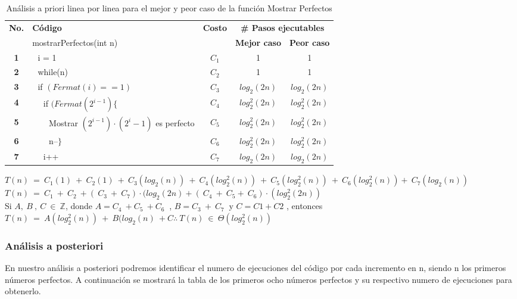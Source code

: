 \documentclass[12pt,twoside]{article}
\begin{document}
\begin{longtable}{||c|l|c|c|c||}
    \caption{An\'alisis a priori linea por linea para el mejor y peor caso de la funci\'on Mostrar Perfectos}\\
    \hline
        \multirow{2}{*}{\textbf{No.}} & \textbf{C\'odigo} & \multirow{2}{*}{\textbf{Costo}} & \multicolumn{2}{|c||}{\textbf{\# Pasos ejecutables}}\\
    \cline{2-2}\cline{4-5}
         & {mostrarPerfectos(int n)} & & \textbf{Mejor caso} & \textbf{Peor caso}\\
    \hline
    \textbf{1}&{\,\,\,\,i = 1}&{$C_{1}$}&{1}&{1}\\
    \hline
    \textbf{2}&{\,\,\,\,while(n)}&{$C_{2}$}&{1}&{1}\\
    \hline
    \textbf{3}&{\,\,\,\,if $(Fermat(i)==1)$}&{$C_{3}$}&{$log_2(2n)$}&{$log_2(2n)$}\\
    \hline
    \textbf{4}&{\,\,\,\,\,\,\,\,if $(Fermat(2^{i-1})\{$}&{$C_{4}$}&{$log_2^2(2n)$}&{$log_2^2(2n)$}\\
    \hline
    \textbf{5}&{\,\,\,\,\,\,\,\,\,\,\,\,Mostrar $(2^{i-1})\cdot(2^i-1)$ es perfecto}&{$C_{5}$}&{$log_2^2(2n)$}&{$log_2^2(2n)$}\\
    \hline
    \textbf{6}&{\,\,\,\,\,\,\,\,\,\,\,\,n--$\}$}&{$C_{6}$}&{$log_2^2(2n)$}&{$log_2^2(2n)$}\\
    \hline
    \textbf{7}&{\,\,\,\,\,\,\,\,i++}&{$C_{7}$}&{$log_2(2n)$}&{$log_2(2n)$}\\
    \hline
\end{longtable}

$T(n)~=~C_{1}(1)~+~C_{2}(1)~+~C_{3}(log_2(n))~+~C_{4}(log_2^2(n))~+~C_{5}(log_2^2(n))~+~C_{6}(log_2^2(n))+~C_{7}(log_2(n))$\\
$T(n)~=~C_{1}~+~C_{2}~+(~C_{3}~+~C_{7})\cdot(log_2(2n)+(~C_{4}~+~C_{5}+~C_{6})\cdot(log_2^2(2n))$\\
Si $A,~B~,~C~\in~\mathbb Z$, donde $A=C_{4}~+C_{5}~+C_{6}~$ , $B=C_{3}~+~C_{7}~$ y $C=C{1}+C{2}$ , entonces $T(n)~=~A(log_2^2(n))~+~B(log_2(n)~+C \therefore~T(n)~\in~\Theta(log_2^2(n))$\\

\newpage
\subsubsection{An\'alisis a posteriori}
En nuestro análisis a posteriori podremos identificar el numero de ejecuciones del código por cada incremento en n, siendo n los primeros números perfectos.
\newline
A continuación se mostrará la tabla de los primeros ocho números perfectos y su respectivo numero de ejecuciones para obtenerlo.
\end{document}
